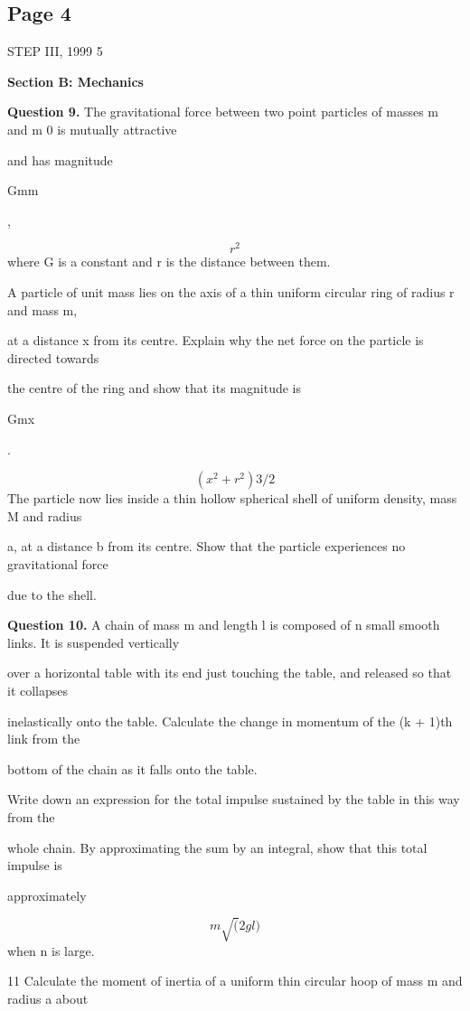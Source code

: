 \documentclass[12pt]{article}
\begin{document}
\subsection*{Page 4}
\begin{flushleft}
STEP III, 1999 5\par
\bigskip\textbf{Section B: Mechanics}\par
\bigskip\textbf{Question 9.} The gravitational force between two point particles of masses m and m 0 is mutually attractive\par
and has magnitude\par
Gmm\par
,\par
\[r^2\]
where G is a constant and r is the distance between them.\par
A particle of unit mass lies on the axis of a thin uniform circular ring of radius r and mass m,\par
at a distance x from its centre. Explain why the net force on the particle is directed towards\par
the centre of the ring and show that its magnitude is\par
Gmx\par
.\par
\[(x^2 + r^2)3/2\]
The particle now lies inside a thin hollow spherical shell of uniform density, mass M and radius\par
a, at a distance b from its centre. Show that the particle experiences no gravitational force\par
due to the shell.\par
\bigskip\textbf{Question 10.} A chain of mass m and length l is composed of n small smooth links. It is suspended vertically\par
over a horizontal table with its end just touching the table, and released so that it collapses\par
inelastically onto the table. Calculate the change in momentum of the (k + 1)th link from the\par
bottom of the chain as it falls onto the table.\par
Write down an expression for the total impulse sustained by the table in this way from the\par
whole chain. By approximating the sum by an integral, show that this total impulse is\par
approximately\par
\[m\sqrt(2gl)\]
when n is large.\par
11 Calculate the moment of inertia of a uniform thin circular hoop of mass m and radius a about\par

\end{flushleft}
\end{document}
